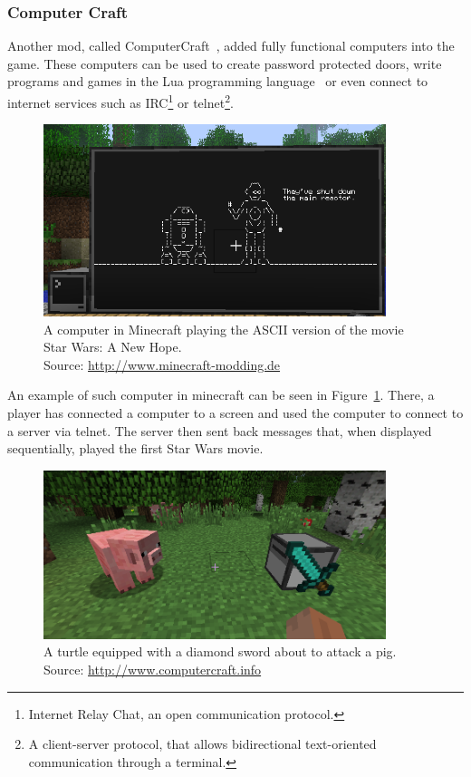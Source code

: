 \subsubsection{Computer Craft}

Another mod, called ComputerCraft~\cite{ComputerCraft}, added fully functional computers into the game. 
These computers can be used to create password protected
doors, write programs and games in the Lua programming language~\cite{Lua} or even connect to internet services such 
as IRC\footnote{Internet Relay Chat, an open communication 
protocol.} or telnet\footnote{A client-server protocol, that allows bidirectional text-oriented communication through a terminal.}.

\begin{figure}[h]
    \centering
    \includegraphics[width=10cm]{../img/ComputerCraft2.png}
    \caption{A computer in Minecraft playing the ASCII version of the movie Star Wars: A New Hope.
             \\Source: \href{http://minecraft-modding.de/wp-content/uploads/2015/06/ComputerCraft2.png}{http://www.minecraft-modding.de}}
    \label{computer-craft}
\end{figure}

An example of such computer in minecraft can be seen in Figure~\ref{computer-craft}. There, a player has connected a computer to a screen
and used the computer to connect to a server via telnet. The server then sent back messages that, when displayed sequentially, played
the first Star Wars movie.

\begin{figure}[h]
    \centering
    \includegraphics[width=10cm]{../img/CC-turtle.png}
    \caption{A turtle equipped with a diamond sword about to attack a pig.
             \\Source: \href{http://computercraft.info/wp-content/uploads/2012/07/piggy.png}{http://www.computercraft.info}}
    \label{cc-turtle}
\end{figure}

